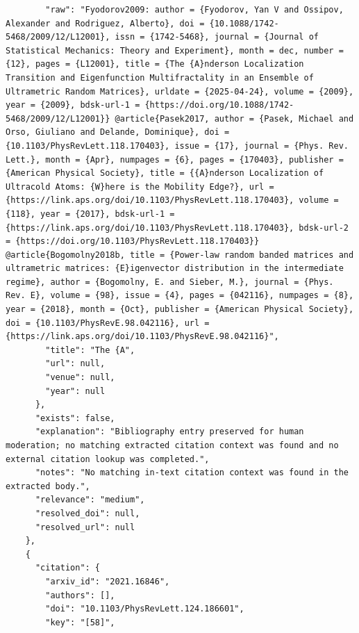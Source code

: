 \documentclass[11pt]{article}
\begin{document}
\begin{verbatim}
        "raw": "Fyodorov2009: author = {Fyodorov, Yan V and Ossipov, Alexander and Rodriguez, Alberto}, doi = {10.1088/1742-5468/2009/12/L12001}, issn = {1742-5468}, journal = {Journal of Statistical Mechanics: Theory and Experiment}, month = dec, number = {12}, pages = {L12001}, title = {The {A}nderson Localization Transition and Eigenfunction Multifractality in an Ensemble of Ultrametric Random Matrices}, urldate = {2025-04-24}, volume = {2009}, year = {2009}, bdsk-url-1 = {https://doi.org/10.1088/1742-5468/2009/12/L12001}} @article{Pasek2017, author = {Pasek, Michael and Orso, Giuliano and Delande, Dominique}, doi = {10.1103/PhysRevLett.118.170403}, issue = {17}, journal = {Phys. Rev. Lett.}, month = {Apr}, numpages = {6}, pages = {170403}, publisher = {American Physical Society}, title = {{A}nderson Localization of Ultracold Atoms: {W}here is the Mobility Edge?}, url = {https://link.aps.org/doi/10.1103/PhysRevLett.118.170403}, volume = {118}, year = {2017}, bdsk-url-1 = {https://link.aps.org/doi/10.1103/PhysRevLett.118.170403}, bdsk-url-2 = {https://doi.org/10.1103/PhysRevLett.118.170403}} @article{Bogomolny2018b, title = {Power-law random banded matrices and ultrametric matrices: {E}igenvector distribution in the intermediate regime}, author = {Bogomolny, E. and Sieber, M.}, journal = {Phys. Rev. E}, volume = {98}, issue = {4}, pages = {042116}, numpages = {8}, year = {2018}, month = {Oct}, publisher = {American Physical Society}, doi = {10.1103/PhysRevE.98.042116}, url = {https://link.aps.org/doi/10.1103/PhysRevE.98.042116}",
        "title": "The {A",
        "url": null,
        "venue": null,
        "year": null
      },
      "exists": false,
      "explanation": "Bibliography entry preserved for human moderation; no matching extracted citation context was found and no external citation lookup was completed.",
      "notes": "No matching in-text citation context was found in the extracted body.",
      "relevance": "medium",
      "resolved_doi": null,
      "resolved_url": null
    },
    {
      "citation": {
        "arxiv_id": "2021.16846",
        "authors": [],
        "doi": "10.1103/PhysRevLett.124.186601",
        "key": "[58]",

\end{verbatim}
\end{document}
